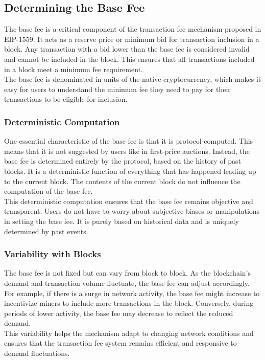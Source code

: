 \subsection{Determining the Base Fee}
The base fee is a critical component of the transaction fee mechanism proposed in EIP-1559. It acts as a reserve price or minimum bid for transaction inclusion in a block. Any transaction with a bid lower than the base fee is considered invalid and cannot be included in the block. This ensures that all transactions included in a block meet a minimum fee requirement.\\

The base fee is denominated in units of the native cryptocurrency, which makes it easy for users to understand the minimum fee they need to pay for their transactions to be eligible for inclusion.

\subsubsection{Deterministic Computation}
One essential characteristic of the base fee is that it is protocol-computed. This means that it is not suggested by users like in first-price auctions. Instead, the base fee is determined entirely by the protocol, based on the history of past blocks. It is a deterministic function of everything that has happened leading up to the current block. The contents of the current block do not influence the computation of the base fee.\\
This deterministic computation ensures that the base fee remains objective and transparent. Users do not have to worry about subjective biases or manipulations in setting the base fee. It is purely based on historical data and is uniquely determined by past events.

\subsubsection{Variability with Blocks}
The base fee is not fixed but can vary from block to block. As the blockchain's demand and transaction volume fluctuate, the base fee can adjust accordingly. For example, if there is a surge in network activity, the base fee might increase to incentivize miners to include more transactions in the block. Conversely, during periods of lower activity, the base fee may decrease to reflect the reduced demand.\\
This variability helps the mechanism adapt to changing network conditions and ensures that the transaction fee system remains efficient and responsive to demand fluctuations.

